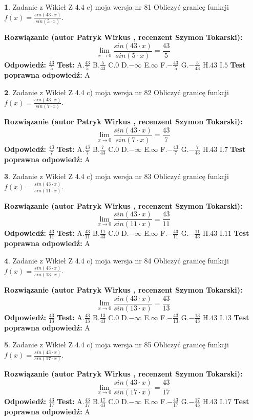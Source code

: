 \documentclass[12pt, a4paper]{article}
\theoremstyle{definition} %
\newtheorem{zad}{}
\newcommand{\zadStart}[1]{\begin{zad}#1\newline}
\newcommand{\zadStop}{\end{zad}}
\newcommand{\rozwStart}[2]{\noindent \textbf{Rozwiązanie (autor #1 , recenzent #2): }\newline}
\newcommand{\rozwStop}{\newline}
\newcommand{\odpStart}{\noindent \textbf{Odpowiedź:}\newline}
\newcommand{\odpStop}{\newline}
\newcommand{\testStart}{\noindent \textbf{Test:}\newline}
\newcommand{\testStop}{\newline}
\newcommand{\kluczStart}{\noindent \textbf{Test poprawna odpowiedź:}\newline}
\newcommand{\kluczStop}{\newline}
\begin{document}
\zadStart{Zadanie z Wikieł Z 4.4 c) moja wersja nr 81}
Obliczyć granicę funkcji $f(x)=\frac{sin(43\cdot x)}{sin(5\cdot x)}$.
\zadStop
\rozwStart{Patryk Wirkus}{Szymon Tokarski}
$$\lim\limits_{x\to 0}\frac{sin(43\cdot x)}{sin(5\cdot x)}=
\frac{43}{5}$$
\rozwStop
\odpStart
$\frac{43}{5}$
\odpStop
\testStart
A.$\frac{43}{5}$
B.$\frac{5}{43}$
C.$0$
D.$-\infty$
E.$\infty$
F.$-\frac{43}{5}$
G.$-\frac{5}{43}$
H.$43$
I.$5$
\testStop
\kluczStart
A
\kluczStop



\zadStart{Zadanie z Wikieł Z 4.4 c) moja wersja nr 82}
Obliczyć granicę funkcji $f(x)=\frac{sin(43\cdot x)}{sin(7\cdot x)}$.
\zadStop
\rozwStart{Patryk Wirkus}{Szymon Tokarski}
$$\lim\limits_{x\to 0}\frac{sin(43\cdot x)}{sin(7\cdot x)}=
\frac{43}{7}$$
\rozwStop
\odpStart
$\frac{43}{7}$
\odpStop
\testStart
A.$\frac{43}{7}$
B.$\frac{7}{43}$
C.$0$
D.$-\infty$
E.$\infty$
F.$-\frac{43}{7}$
G.$-\frac{7}{43}$
H.$43$
I.$7$
\testStop
\kluczStart
A
\kluczStop



\zadStart{Zadanie z Wikieł Z 4.4 c) moja wersja nr 83}
Obliczyć granicę funkcji $f(x)=\frac{sin(43\cdot x)}{sin(11\cdot x)}$.
\zadStop
\rozwStart{Patryk Wirkus}{Szymon Tokarski}
$$\lim\limits_{x\to 0}\frac{sin(43\cdot x)}{sin(11\cdot x)}=
\frac{43}{11}$$
\rozwStop
\odpStart
$\frac{43}{11}$
\odpStop
\testStart
A.$\frac{43}{11}$
B.$\frac{11}{43}$
C.$0$
D.$-\infty$
E.$\infty$
F.$-\frac{43}{11}$
G.$-\frac{11}{43}$
H.$43$
I.$11$
\testStop
\kluczStart
A
\kluczStop



\zadStart{Zadanie z Wikieł Z 4.4 c) moja wersja nr 84}
Obliczyć granicę funkcji $f(x)=\frac{sin(43\cdot x)}{sin(13\cdot x)}$.
\zadStop
\rozwStart{Patryk Wirkus}{Szymon Tokarski}
$$\lim\limits_{x\to 0}\frac{sin(43\cdot x)}{sin(13\cdot x)}=
\frac{43}{13}$$
\rozwStop
\odpStart
$\frac{43}{13}$
\odpStop
\testStart
A.$\frac{43}{13}$
B.$\frac{13}{43}$
C.$0$
D.$-\infty$
E.$\infty$
F.$-\frac{43}{13}$
G.$-\frac{13}{43}$
H.$43$
I.$13$
\testStop
\kluczStart
A
\kluczStop



\zadStart{Zadanie z Wikieł Z 4.4 c) moja wersja nr 85}
Obliczyć granicę funkcji $f(x)=\frac{sin(43\cdot x)}{sin(17\cdot x)}$.
\zadStop
\rozwStart{Patryk Wirkus}{Szymon Tokarski}
$$\lim\limits_{x\to 0}\frac{sin(43\cdot x)}{sin(17\cdot x)}=
\frac{43}{17}$$
\rozwStop
\odpStart
$\frac{43}{17}$
\odpStop
\testStart
A.$\frac{43}{17}$
B.$\frac{17}{43}$
C.$0$
D.$-\infty$
E.$\infty$
F.$-\frac{43}{17}$
G.$-\frac{17}{43}$
H.$43$
I.$17$
\testStop
\kluczStart
A
\kluczStop
\end{document}
